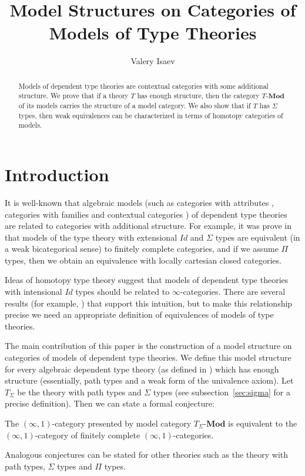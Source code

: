 \documentclass{mscs}
\title{Model Structures on Categories of Models of Type Theories}
\author{Valery Isaev}
\newcommand{\cat}[1]{\mathbf{#1}}
\newcommand{\Mod}[1]{#1\text{-}\cat{Mod}}
\numberwithin{figure}{section}
\begin{document}
\maketitle

\begin{abstract}
Models of dependent type theories are contextual categories with some additional structure.
We prove that if a theory $T$ has enough structure, then the category $\Mod{T}$ of its models carries the structure of a model category.
We also show that if $T$ has $\Sigma$ types, then weak equivalences can be characterized in terms of homotopy categories of models.
\end{abstract}

\section{Introduction}

It is well-known that algebraic models (such as categories with attributes \cite{pitts}, categories with families \cite{cwf} and contextual categories \cite{GAT})
of dependent type theories are related to categories with additional structure.
For example, it was prove in \cite{ext-eq} that models of the type theory with extensional $Id$ and $\Sigma$ types are equivalent (in a weak bicategorical sense)
to finitely complete categories, and if we assume $\Pi$ types, then we obtain an equivalence with locally cartesian closed categories.

Ideas of homotopy type theory suggest that models of dependent type theories with intensional $Id$ types should be related to $\infty$-categories.
There are several results (for example, \cite{shul-inv,local-universes,kapulkin}) that support this intuition,
but to make this relationship precise we need an appropriate definition of equivalences of models of type theories.

The main contribution of this paper is the construction of a model structure on categories of models of dependent type theories.
We define this model structure for every algebraic dependent type theory (as defined in \cite{alg-tt}) which has enough structure
(essentially, path types and a weak form of the univalence axiom).
Let $T_\Sigma$ be the theory with path types and $\Sigma$ types (see subsection~\ref{sec:sigma} for a precise definition).
Then we can state a formal conjecture:
\begin{conj}[main]
The $(\infty,1)$-category presented by model category $\Mod{T_\Sigma}$ is equivalent to the $(\infty,1)$-category of finitely complete $(\infty,1)$-categories.
\end{conj}
Analogous conjectures can be stated for other theories such as the theory with path types, $\Sigma$ types and $\Pi$ types.
\end{document}
